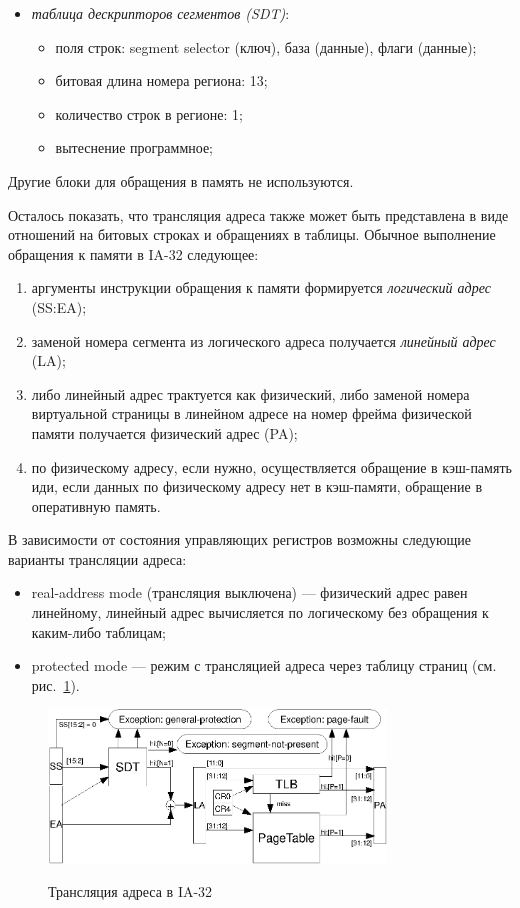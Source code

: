 \documentclass[14pt]{extreport}
\begin{document}
\begin{itemize}
  \item \emph{таблица дескрипторов сегментов (SDT)}:
        \begin{itemize}
            \item поля строк: segment selector (ключ), база (данные), флаги (данные);
            \item битовая длина номера региона: 13;
            \item количество строк в регионе: 1;
            \item вытеснение программное;
        \end{itemize}
\end{itemize}

Другие блоки для обращения в память не используются.

Осталось показать, что трансляция адреса также может быть представлена в виде
отношений на битовых строках и обращениях в таблицы. Обычное выполнение обращения к памяти в IA-32 следующее:
\begin{enumerate}
    \item аргументы инструкции обращения к памяти формируется \emph{логический адрес} (SS:EA);
    \item заменой номера сегмента из логического адреса получается \emph{линейный адрес} (LA);
    \item либо линейный адрес трактуется как физический, либо заменой номера виртуальной страницы в линейном адресе на номер фрейма физической памяти получается физический адрес (PA);
    \item по физическому адресу, если нужно, осуществляется обращение в кэш-память иди, если данных по физическому адресу нет в кэш-памяти, обращение в оперативную память.
\end{enumerate}

В зависимости от состояния управляющих регистров возможны следующие варианты трансляции адреса:
\begin{itemize}
  \item real-address mode (трансляция выключена) --- физический адрес равен линейному, линейный адрес вычисляется по логическому без обращения к каким-либо таблицам;
  \item protected mode --- режим с трансляцией адреса через таблицу страниц (см. рис.~\ref{fig:ia32_address_translation}).
\end{itemize}

\begin{figure}[h] \center
  \includegraphics[width=0.8\textwidth]{4.analysis/ia32_addrtrans}\\
  \caption{Трансляция адреса в IA-32}\label{fig:ia32_address_translation}
\end{figure}
\end{document}
